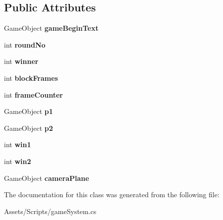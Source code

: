 \subsection*{Public Attributes}
\begin{DoxyCompactItemize}
\item 
Game\+Object {\bfseries game\+Begin\+Text}\hypertarget{classgame_system_a6c6ed1bd09eeba15452b9ac4a40321ba}{}\label{classgame_system_a6c6ed1bd09eeba15452b9ac4a40321ba}

\item 
int {\bfseries round\+No}\hypertarget{classgame_system_a781d5ddce52469331270d4aae2cf7f34}{}\label{classgame_system_a781d5ddce52469331270d4aae2cf7f34}

\item 
int {\bfseries winner}\hypertarget{classgame_system_a9459817099a0d32f79ec55e52afcd8c4}{}\label{classgame_system_a9459817099a0d32f79ec55e52afcd8c4}

\item 
int {\bfseries block\+Frames}\hypertarget{classgame_system_a74d25ee5030c0d5efe57ce3fe9a1064f}{}\label{classgame_system_a74d25ee5030c0d5efe57ce3fe9a1064f}

\item 
int {\bfseries frame\+Counter}\hypertarget{classgame_system_a5470363fba34ef68d045e6b779e25cfd}{}\label{classgame_system_a5470363fba34ef68d045e6b779e25cfd}

\item 
Game\+Object {\bfseries p1}\hypertarget{classgame_system_a0dd0a5493cd96e0a9d2a8dfa8d6de717}{}\label{classgame_system_a0dd0a5493cd96e0a9d2a8dfa8d6de717}

\item 
Game\+Object {\bfseries p2}\hypertarget{classgame_system_abfd5f48112351397bbefbce859005419}{}\label{classgame_system_abfd5f48112351397bbefbce859005419}

\item 
int {\bfseries win1}\hypertarget{classgame_system_a91da1d6d4912b1316bfc7e4473c77989}{}\label{classgame_system_a91da1d6d4912b1316bfc7e4473c77989}

\item 
int {\bfseries win2}\hypertarget{classgame_system_a8a06ba966365341989a1d2364ec4f6da}{}\label{classgame_system_a8a06ba966365341989a1d2364ec4f6da}

\item 
Game\+Object {\bfseries camera\+Plane}\hypertarget{classgame_system_a2adb9bd677ec76fec3250f3d5392ed7c}{}\label{classgame_system_a2adb9bd677ec76fec3250f3d5392ed7c}

\end{DoxyCompactItemize}


The documentation for this class was generated from the following file\+:\begin{DoxyCompactItemize}
\item 
Assets/\+Scripts/game\+System.\+cs\end{DoxyCompactItemize}

